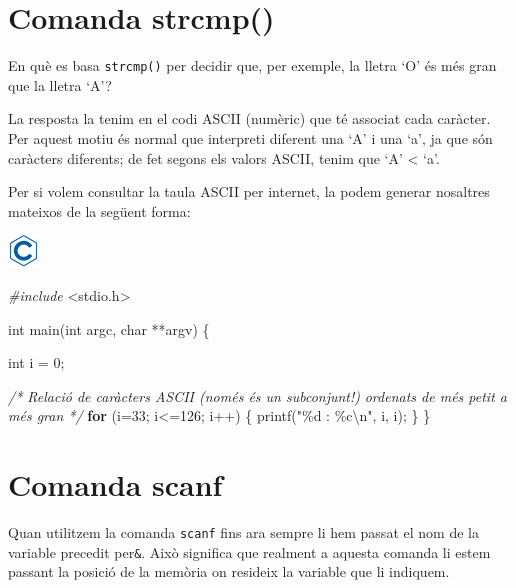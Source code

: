 \documentclass[]{book}
\newenvironment{Shaded}{\begin{snugshade}}{\end{snugshade}}
\newcommand{\CommentTok}[1]{\textcolor[rgb]{0.56,0.35,0.01}{\textit{#1}}}
\newcommand{\ControlFlowTok}[1]{\textcolor[rgb]{0.13,0.29,0.53}{\textbf{#1}}}
\newcommand{\DataTypeTok}[1]{\textcolor[rgb]{0.13,0.29,0.53}{#1}}
\newcommand{\DecValTok}[1]{\textcolor[rgb]{0.00,0.00,0.81}{#1}}
\newcommand{\ImportTok}[1]{#1}
\newcommand{\NormalTok}[1]{#1}
\newcommand{\PreprocessorTok}[1]{\textcolor[rgb]{0.56,0.35,0.01}{\textit{#1}}}
\newcommand{\SpecialCharTok}[1]{\textcolor[rgb]{0.00,0.00,0.00}{#1}}
\newcommand{\StringTok}[1]{\textcolor[rgb]{0.31,0.60,0.02}{#1}}
\begin{document}
\hypertarget{comanda-strcmp}{%
\section{Comanda strcmp()}\label{comanda-strcmp}}

En què es basa \texttt{strcmp()} per decidir que, per exemple, la lletra `O' és més gran que la lletra `A'?

La resposta la tenim en el codi ASCII (numèric) que té associat cada caràcter. Per aquest motiu és normal que interpreti diferent una `A' i una `a', ja que són caràcters diferents; de fet segons els valors ASCII, tenim que `A' \textless{} `a'.

Per si volem consultar la taula ASCII per internet, la podem generar nosaltres mateixos de la següent forma:

\includegraphics{./img/c.png}

\begin{Shaded}
\begin{Highlighting}[]
\PreprocessorTok{\#include }\ImportTok{\textless{}stdio.h\textgreater{}}

\DataTypeTok{int}\NormalTok{ main(}\DataTypeTok{int}\NormalTok{ argc, }\DataTypeTok{char}\NormalTok{ **argv) \{}

    \DataTypeTok{int}\NormalTok{ i = }\DecValTok{0}\NormalTok{;}

    \CommentTok{/* Relació de caràcters ASCII (només és un subconjunt!)}
\CommentTok{       ordenats de més petit a més gran */}
    \ControlFlowTok{for}\NormalTok{ (i=}\DecValTok{33}\NormalTok{; i\textless{}=}\DecValTok{126}\NormalTok{; i++) \{}
\NormalTok{        printf(}\StringTok{"\%d : \%c}\SpecialCharTok{\textbackslash{}n}\StringTok{"}\NormalTok{, i, i);}
\NormalTok{    \}}
\NormalTok{\}}
\end{Highlighting}
\end{Shaded}

\hypertarget{comanda-scanf}{%
\section{Comanda scanf}\label{comanda-scanf}}

Quan utilitzem la comanda \texttt{scanf} fins ara sempre li hem passat el nom de la variable precedit per\texttt{\&}. Això significa que realment a aquesta comanda li estem passant la posició de la memòria on resideix la variable que li indiquem.
\end{document}
